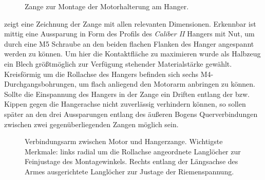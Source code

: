 		\begin{figure}[h]
			\centering
			
			\caption[Zange zur Montage der Motorhalterung am Hanger]{Zange zur Montage der Motorhalterung am Hanger.}%
			\label{fig:hanger clamp drawing}
		\end{figure}
		 zeigt eine Zeichnung der Zange mit allen relevanten Dimensionen.
		Erkennbar ist mittig eine Aussparung in Form des Profils des \textit{Caliber II} Hangers mit Nut, um durch eine M5 Schraube an den beiden flachen Flanken des Hanger angespannt werden zu können.
		Um hier die Kontaktfläche zu maximieren wurde als Halbzeug ein Blech größtmöglich zur Verfügung stehender Materialstärke gewählt.
		Kreisförmig um die Rollachse des Hangers befinden sich sechs M4-Durchgangsbohrungen, um flach anliegend den Motorarm anbringen zu können.
		Sollte die Einspannung des Hangers in der Zange ein Driften entlang der bzw. Kippen gegen die Hangerachse nicht zuverlässig verhindern können, so sollen später an den drei Aussparungen entlang des äußeren Bogens Querverbindungen zwischen zwei gegenüberliegenden Zangen möglich sein.
		\begin{figure}[h]
			\centering
			
			\caption[Verbindungsarm zwischen Motor und Hangerzange]{Verbindungsarm zwischen Motor und Hangerzange. Wichtigste Merkmale: links radial um die Rollachse angeordnete Langlöcher zur Feinjustage des Montagewinkels. Rechts entlang der Längsachse des Armes ausgerichtete Langlöcher zur Justage der Riemenspannung.}%
			\label{fig:motor piece drawing}
		\end{figure}

